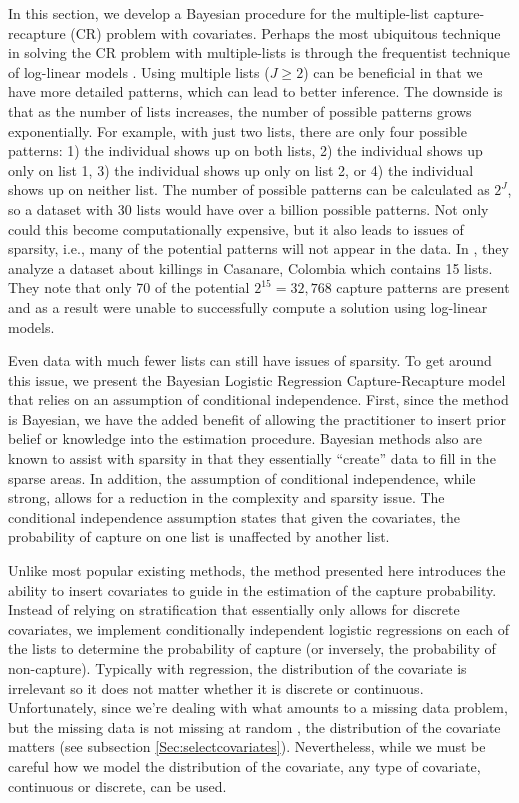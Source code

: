 \documentclass[
  12pt,
]{article}
\begin{document}
In this section, we develop a Bayesian procedure for the multiple-list
capture-recapture (CR) problem with covariates. Perhaps the most
ubiquitous technique in solving the CR problem with multiple-lists is
through the frequentist technique of log-linear models
\citep{fienberg_multiple_1972}. Using multiple lists (\(J\ge 2\)) can be
beneficial in that we have more detailed patterns, which can lead to
better inference. The downside is that as the number of lists increases,
the number of possible patterns grows exponentially. For example, with
just two lists, there are only four possible patterns: 1) the individual
shows up on both lists, 2) the individual shows up only on list 1, 3)
the individual shows up only on list 2, or 4) the individual shows up on
neither list. The number of possible patterns can be calculated as
\(2^J\), so a dataset with 30 lists would have over a billion possible
patterns. Not only could this become computationally expensive, but it
also leads to issues of sparsity, i.e., many of the potential patterns
will not appear in the data. In \cite{manriquevallier_bayesian_2016},
they analyze a dataset about killings in Casanare, Colombia which
contains 15 lists. They note that only 70 of the potential
\(2^{15}=32,768\) capture patterns are present and as a result were
unable to successfully compute a solution using log-linear models.

Even data with much fewer lists can still have issues of sparsity. To
get around this issue, we present the Bayesian Logistic Regression
Capture-Recapture model that relies on an assumption of conditional
independence. First, since the method is Bayesian, we have the added
benefit of allowing the practitioner to insert prior belief or knowledge
into the estimation procedure. Bayesian methods also are known to assist
with sparsity in that they essentially ``create'' data to fill in the
sparse areas. In addition, the assumption of conditional independence,
while strong, allows for a reduction in the complexity and sparsity
issue. The conditional independence assumption states that given the
covariates, the probability of capture on one list is unaffected by
another list.

Unlike most popular existing methods, the method presented here
introduces the ability to insert covariates to guide in the estimation
of the capture probability. Instead of relying on stratification that
essentially only allows for discrete covariates, we implement
conditionally independent logistic regressions on each of the lists to
determine the probability of capture (or inversely, the probability of
non-capture). Typically with regression, the distribution of the
covariate is irrelevant so it does not matter whether it is discrete or
continuous. Unfortunately, since we're dealing with what amounts to a
missing data problem, but the missing data is not missing at random
\citep{rubin_inference_1976}, the distribution of the covariate matters
(see subsection \ref{Sec:selectcovariates}). Nevertheless, while we must
be careful how we model the distribution of the covariate, any type of
covariate, continuous or discrete, can be used.
\end{document}
